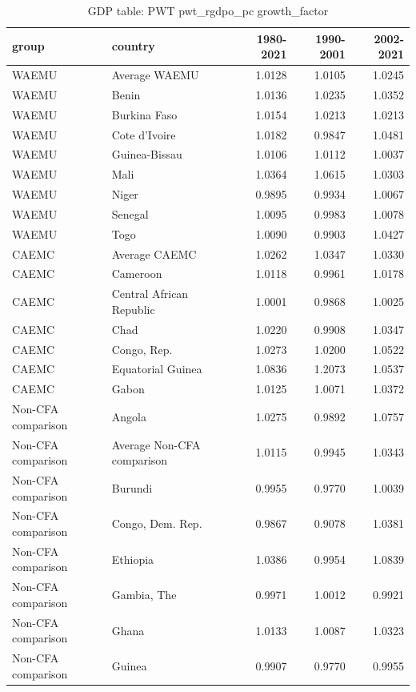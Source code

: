 \begin{table}

\caption{GDP table: PWT pwt_rgdpo_pc growth_factor}
\centering
\begin{tabular}[t]{llrrr}
\toprule
group & country & 1980-2021 & 1990-2001 & 2002-2021\\
\midrule
WAEMU & Average WAEMU & 1.0128 & 1.0105 & 1.0245\\
WAEMU & Benin & 1.0136 & 1.0235 & 1.0352\\
WAEMU & Burkina Faso & 1.0154 & 1.0213 & 1.0213\\
WAEMU & Cote d'Ivoire & 1.0182 & 0.9847 & 1.0481\\
WAEMU & Guinea-Bissau & 1.0106 & 1.0112 & 1.0037\\
\addlinespace
WAEMU & Mali & 1.0364 & 1.0615 & 1.0303\\
WAEMU & Niger & 0.9895 & 0.9934 & 1.0067\\
WAEMU & Senegal & 1.0095 & 0.9983 & 1.0078\\
WAEMU & Togo & 1.0090 & 0.9903 & 1.0427\\
CAEMC & Average CAEMC & 1.0262 & 1.0347 & 1.0330\\
\addlinespace
CAEMC & Cameroon & 1.0118 & 0.9961 & 1.0178\\
CAEMC & Central African Republic & 1.0001 & 0.9868 & 1.0025\\
CAEMC & Chad & 1.0220 & 0.9908 & 1.0347\\
CAEMC & Congo, Rep. & 1.0273 & 1.0200 & 1.0522\\
CAEMC & Equatorial Guinea & 1.0836 & 1.2073 & 1.0537\\
\addlinespace
CAEMC & Gabon & 1.0125 & 1.0071 & 1.0372\\
Non-CFA comparison & Angola & 1.0275 & 0.9892 & 1.0757\\
Non-CFA comparison & Average Non-CFA comparison & 1.0115 & 0.9945 & 1.0343\\
Non-CFA comparison & Burundi & 0.9955 & 0.9770 & 1.0039\\
Non-CFA comparison & Congo, Dem. Rep. & 0.9867 & 0.9078 & 1.0381\\
\addlinespace
Non-CFA comparison & Ethiopia & 1.0386 & 0.9954 & 1.0839\\
Non-CFA comparison & Gambia, The & 0.9971 & 1.0012 & 0.9921\\
Non-CFA comparison & Ghana & 1.0133 & 1.0087 & 1.0323\\
Non-CFA comparison & Guinea & 0.9907 & 0.9770 & 0.9955\\

\end{tabular}
\end{table}
